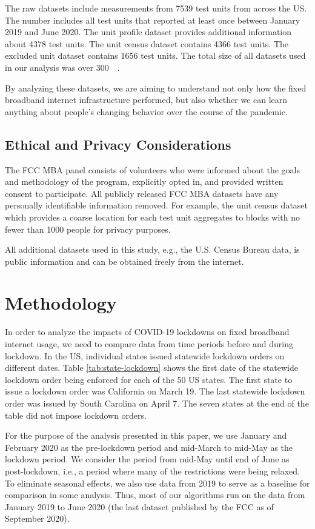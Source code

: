 \documentclass[conference,10pt]{IEEEtran}
\begin{document}
The raw datasets include measurements from 7539 test units from across the US. The number includes all test units that reported at least once between January 2019 and June 2020. The unit profile dataset provides additional information about 4378 test units. The unit census dataset contains 4366 test units. The excluded unit dataset contains 1656 test units. The total size of all datasets used in our analysis was over \SI{300}{\giga\byte}.

By analyzing these datasets, we are aiming to understand not only how the fixed broadband internet infrastructure performed, but also whether we can learn anything about people's changing behavior over the course of the pandemic.

\subsection{Ethical and Privacy Considerations}
\label{sec:ethical-and-privacy-considerations}

The FCC MBA panel consists of volunteers who were informed about the goals and methodology of the program, explicitly opted in, and provided written consent to participate. All publicly released FCC MBA datasets have any personally identifiable information removed. For example, the unit census dataset which provides a coarse location for each test unit aggregates to blocks with no fewer than 1000 people for privacy purposes.

All additional datasets used in this study, e.g., the U.S. Census Bureau data, is public information and can be obtained freely from the internet.

\section{Methodology}
\label{sec:methodology}

In order to analyze the impacts of COVID-19 lockdowns on fixed broadband internet usage, we need to compare data from time periods before and during lockdown. In the US, individual states issued statewide lockdown orders on different dates. Table \ref{tab:state-lockdown} shows the first date of the statewide lockdown order being enforced for each of the 50 US states. The first state to issue a lockdown order was California on March 19. The last statewide lockdown order was issued by South Carolina on April 7. The seven states at the end of the table did not impose lockdown orders.

For the purpose of the analysis presented in this paper, we use January and February 2020 as the pre-lockdown period and mid-March to mid-May as the lockdown period. We consider the period from mid-May until end of June as post-lockdown, i.e., a period where many of the restrictions were being relaxed. To eliminate seasonal effects, we also use data from 2019 to serve as a baseline for comparison in some analysis. Thus, most of our algorithms run on the data from January 2019 to June 2020 (the last dataset published by the FCC as of September 2020).
\end{document}
